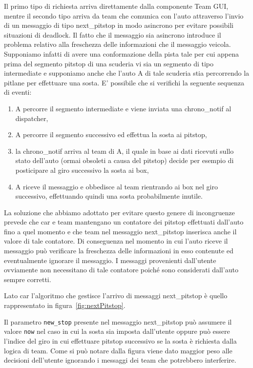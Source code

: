 \documentclass[11pt,a4paper]{report}
\newcommand{\fun}[1]{\texttt{#1}}
\begin{document}
Il primo tipo di richiesta arriva direttamente dalla componente Team GUI, mentre il secondo tipo arriva da team che comunica con l'auto attraverso l'invio di un messaggio di tipo next\_pitstop in modo asincrono per evitare possibili situazioni di deadlock. Il fatto che il messaggio sia asincrono introduce il problema relativo alla freschezza delle informazioni che il messaggio veicola. Supponiamo infatti di avere una conformazione della pista tale per cui appena prima del segmento pitstop di una scuderia vi sia un segmento di tipo intermediate e supponiamo anche che l'auto A di tale scuderia stia percorrendo la pitlane per effettuare una sosta.
E' possibile che si verifichi la seguente sequenza di eventi:
\begin{enumerate}
\item A percorre il segmento intermediate e viene inviata una chrono\_notif al dispatcher,
\item A percorre il segmento successivo ed effettua la sosta ai pitstop,
\item la chrono\_notif arriva al team di A, il quale in base ai dati ricevuti sullo stato dell'auto (ormai obsoleti a causa del pitstop) decide per esempio di posticipare al giro successivo la sosta ai box,
\item A riceve il messaggio e obbedisce al team rientrando ai box nel giro successivo, effettuando quindi una sosta probabilmente inutile.
\end{enumerate}

La soluzione che abbiamo adottato per evitare questo genere di incongruenze prevede che car e team mantengano un contatore dei pitstop effettuati dall'auto fino a quel momento e che team nel messaggio next\_pitstop inserisca anche il valore di tale contatore. Di conseguenza nel momento in cui l'auto riceve il messaggio può verificare la freschezza delle informazioni in esso contenute ed eventualmente ignorare il messaggio. I messaggi provenienti dall'utente ovviamente non necessitano di tale contatore poiché sono considerati dall'auto sempre corretti.

Lato car l'algoritmo che gestisce l'arrivo di messaggi next\_pitstop è quello rappresentato in figura~\ref{fig:nextPitstop}.

Il parametro \fun{new\_stop} presente nel messaggio next\_pitstop può assumere il valore \fun{now} nel caso in cui la sosta sia imposta dall'utente oppure può essere l'indice del giro in cui effettuare pitstop successivo se la sosta è richiesta dalla logica di team. Come si può notare dalla figura viene dato maggior peso alle decisioni dell'utente ignorando i messaggi dei team che potrebbero interferire.
\end{document}
